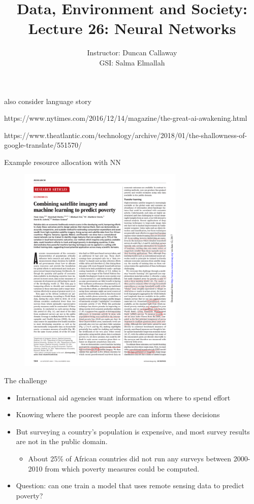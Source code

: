 \documentclass[mathserif, aspectratio=169]{beamer}
\title[Lecture 26] 
{Data, Environment and Society: \\{Lecture 26: Neural Networks}}
\author[ER131: Data, Environment and Society] 
{Instructor: Duncan Callaway\\
GSI: Salma Elmallah}
\institute[UC Berkeley] %
 {\small{ \bf December 3, 2019}}
\date[December 3, 2019]
\begin{document}
\frame{
	\titlepage
}

\begin{frame}
	also consider language story

	https://www.nytimes.com/2016/12/14/magazine/the-great-ai-awakening.html

	https://www.theatlantic.com/technology/archive/2018/01/the-shallowness-of-google-translate/551570/
\end{frame}


\begin{frame}{Example resource allocation with NN}
\begin{figure}
\includegraphics[width=0.7\textwidth]{jean_header}
\caption*{}
\end{figure}
\end{frame}

\begin{frame}{The challenge}

\begin{itemize}
\item International aid agencies want information on where to spend effort
\item Knowing where the poorest people are can inform these decisions
\item But surveying a country's population is expensive, and most survey results are not in the public domain.  
\begin{itemize}
\item About 25\% of African countries did not run any surveys between 2000-2010 from which poverty measures could be computed. 
\end{itemize}
\item Question: can one train a model that uses remote sensing data to predict poverty?
\end{itemize}

\end{frame}
\end{document}
